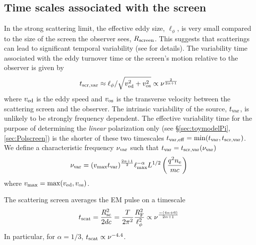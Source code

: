 \documentclass[fleqn,usenatbib]{mnras}
\begin{document}
	\subsection{Time scales associated with the screen}
	\label{sec:timescales}
	In the strong scattering limit, the effective eddy size, $\ell_{\phi}$, is very small compared to the size of the screen the observer sees, $R_{\rm screen}$. This suggests that scatterings can lead to significant temporal variability (see \citealt{BK2020} for details). The variability time associated with the eddy turnover time or the screen's motion relative to the observer is given by
	\begin{equation}
		\label{eq:tscrvar}
		t_{\rm scr,var}\approx \ell_{\phi}/\sqrt{v_{\rm ed}^2+v_{\rm os}^2}\propto \nu^{2\over 2\alpha+1}
	\end{equation}
	where $v_{\rm ed}$ is the eddy speed and $v_{\rm os}$ is the transverse velocity between the scattering screen and the observer.
	The intrinsic variability of the source, $t_{\rm var}$, is unlikely to be strongly frequency dependent. The effective variability time for the purpose of determining the {\it linear} polarization only (see \S \ref{sec:toymodelPi},\ref{sec:Polscreen}) is the shorter of these two timescales $t_{\rm var,eff}=\min(t_{\rm var},t_{\rm scr,var})$. We define a characteristic frequency $\nu_{\rm var}$ such that $t_{\rm var}=t_{\rm scr,var}(\nu_{\rm var})$
	\begin{eqnarray}
		\label{eq:nuvar}
		\nu_{\rm var}=(v_{\rm max}t_{\rm var})^{2\alpha+1\over 2} \ell_{\rm max}^{-\alpha}L^{1/2} \left({q^2 n_{\rm e} \over m c}\right)
	\end{eqnarray}
	where $v_{\rm max}=\max(v_{\rm ed},v_{\rm os})$.
	
	The scattering screen averages the EM pulse on a timescale
	\begin{eqnarray}
		\label{eq:tscat}
		t_{\rm scat}=\frac{R_{\rm sc}^2}{2d c}=\frac{T}{2\pi^2}\frac{R_{\rm F}^2}{\ell_{\phi}^2}\propto \nu^{-(4\alpha+6)\over 2\alpha+1} 
	\end{eqnarray}
	In particular, for $\alpha=1/3$, $t_{\rm scat}\propto \nu^{-4.4}$.
	
\end{document}
